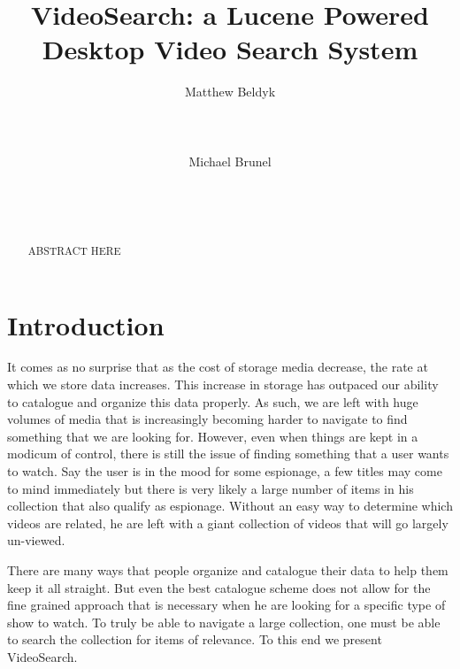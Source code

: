 \documentclass{acm_proc_article-sp}
\begin{document}
\title{VideoSearch: a Lucene Powered Desktop Video Search System}



%
\author{
\alignauthor
Matthew Beldyk\\
       \\
       \\
       \\
\alignauthor
Michael Brunel\\
       \\
       \\
       \\
}
\maketitle
\begin{abstract}

ABSTRACT HERE
\end{abstract}

\section{Introduction}
It comes as no surprise that as the cost of storage media decrease, the rate at which we store data increases. This increase in storage has outpaced our ability to catalogue and organize this data properly. As such, we are left with huge volumes of media that is increasingly becoming harder to navigate to find something that we are looking for. However, even when things are kept in a modicum of control, there is still the issue of finding something that a user wants to watch. Say the user is in the mood for some espionage, a few titles may come to mind immediately but there is very likely a large number of items in his collection that also qualify as espionage. Without an easy way to determine which videos are related, he are left with a giant collection of videos that will go largely un-viewed.

    There are many ways that people organize and catalogue their data to help them keep it all straight. But even the best catalogue scheme does not allow for the fine grained approach that is necessary when he are looking for a specific type of show to watch. To truly be able to navigate a large collection, one must be able to search the collection for items of relevance. To this end we present VideoSearch.  
\end{document}
